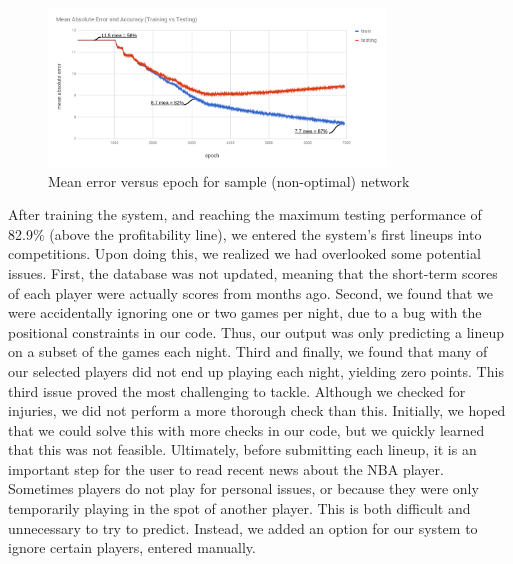 \begin{figure}[ht]
    \centering
    \includegraphics[width=0.8\textwidth]{figures/mea_accuracy}
    \caption{Mean error versus epoch for sample (non-optimal) network}
    \label{fig:train_val}
\end{figure}

After training the system, and reaching the maximum testing performance of 82.9\% (above the profitability line), we entered the system's first lineups into competitions. Upon doing this, we realized we had overlooked some potential issues. First, the database was not updated, meaning that the short-term scores of each player were actually scores from months ago. Second, we found that we were accidentally ignoring one or two games per night, due to a bug with the positional constraints in our code. Thus, our output was only predicting a lineup on a subset of the games each night. Third and finally, we found that many of our selected players did not end up playing each night, yielding zero points. This third issue proved the most challenging to tackle. Although we checked for injuries, we did not perform a more thorough check than this. Initially, we hoped that we could solve this with more checks in our code, but we quickly learned that this was not feasible. Ultimately, before submitting each lineup, it is an important step for the user to read recent news about the NBA player. Sometimes players do not play for personal issues, or because they were only temporarily playing in the spot of another player. This is both difficult and unnecessary to try to predict. Instead, we added an option for our system to ignore certain players, entered manually.

